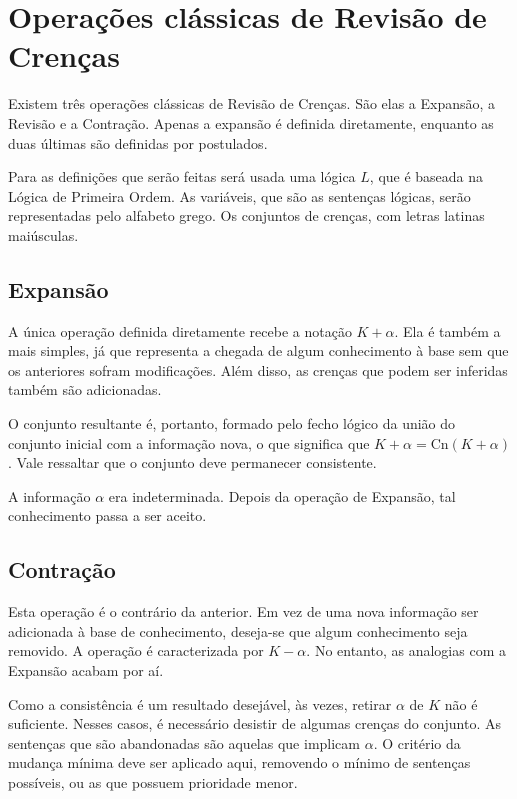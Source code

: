 \section{Operações clássicas de Revisão de Crenças}

Existem três operações clássicas de Revisão de Crenças. São elas a Expansão, a Revisão e a Contração. Apenas a expansão é definida diretamente, enquanto as duas últimas são definidas por postulados. 

Para as definições que serão feitas será usada uma lógica $ L $, que é baseada na Lógica de Primeira Ordem. As variáveis, que são as sentenças lógicas, serão representadas pelo alfabeto grego. Os conjuntos de crenças, com letras latinas maiúsculas.

\subsection{Expansão}

A única operação definida diretamente recebe a notação $ K + \alpha $. Ela é também a mais simples, já que representa a chegada de algum conhecimento à base sem que os anteriores sofram modificações. Além disso, as crenças que podem ser inferidas também são adicionadas.

O conjunto resultante é, portanto, formado pelo fecho lógico da união do conjunto inicial com a informação nova, o que significa que $ K + \alpha = \text{Cn}(K + \alpha) $. Vale ressaltar que o conjunto deve permanecer consistente.

A informação $ \alpha $ era indeterminada. Depois da operação de Expansão, tal conhecimento passa a ser aceito.

\subsection{Contração}

Esta operação é o contrário da anterior. Em vez de uma nova informação ser adicionada à base de conhecimento, deseja-se que algum conhecimento seja removido. A operação é caracterizada por $ K - \alpha $. No entanto, as analogias com a Expansão acabam por aí.

Como a consistência é um resultado desejável, às vezes, retirar $ \alpha $ de $ K $ não é suficiente. Nesses casos, é necessário desistir de algumas crenças do conjunto. As sentenças que são abandonadas são aquelas que implicam $ \alpha $. O critério da mudança mínima deve ser aplicado aqui, removendo o mínimo de sentenças possíveis, ou as que possuem prioridade menor.

